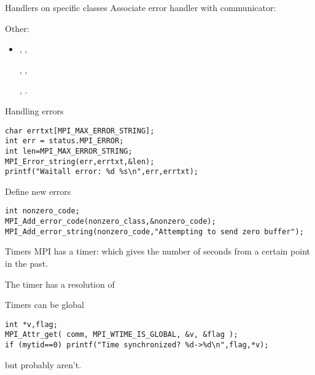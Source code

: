 \begin{numberedframe}{Handlers on specific classes}
Associate error handler with communicator:\\
   

  Other:
\begin{itemize}
\item  {},
  ,
\begin{mpifour}
  ,
  ,
\end{mpifour}
  ,
  .
\end{itemize}  
\end{numberedframe}

\begin{numberedframe}{Handling errors}
\begin{lstlisting}
char errtxt[MPI_MAX_ERROR_STRING];
int err = status.MPI_ERROR;
int len=MPI_MAX_ERROR_STRING;
MPI_Error_string(err,errtxt,&len);
printf("Waitall error: %d %s\n",err,errtxt);    
\end{lstlisting}
\end{numberedframe}

\begin{numberedframe}{Define new errors}
\begin{lstlisting}
int nonzero_code;
MPI_Add_error_code(nonzero_class,&nonzero_code);
MPI_Add_error_string(nonzero_code,"Attempting to send zero buffer");
\end{lstlisting}
\end{numberedframe}


\begin{numberedframe}{Timers}
  MPI has a  timer: 
  which gives the number of seconds from a certain point in the past.

  The timer has a resolution of 

  Timers can be global
\begin{lstlisting}
int *v,flag;
MPI_Attr_get( comm, MPI_WTIME_IS_GLOBAL, &v, &flag );
if (mytid==0) printf("Time synchronized? %d->%d\n",flag,*v);
\end{lstlisting}
  but probably aren't.
\end{numberedframe}

